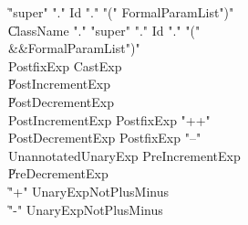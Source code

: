 \begin{grammar}
    \|   \xcd"super"  \xcd"."  Id  \xcd"."  \xcd"("  FormalParamList\opt  \xcd")"\\
    \|   ClassName  \xcd"."  \xcd"super"    \xcd"."  Id  \xcd"."  \xcd"("\\
          &&FormalParamList\opt  \xcd")"\\
 PostfixExp  \:   CastExp\\
    \|   PostIncrementExp\\
    \|   PostDecrementExp\\
 PostIncrementExp  \:   PostfixExp  \xcd"++"\\
 PostDecrementExp  \:   PostfixExp  \xcd"--"\\
 UnannotatedUnaryExp  \:   PreIncrementExp\\
    \|   PreDecrementExp\\
    \|   \xcd"+"  UnaryExpNotPlusMinus\\
    \|   \xcd"-"  UnaryExpNotPlusMinus\\
\end{grammar}

